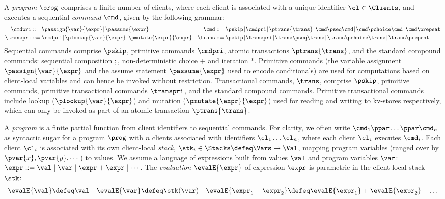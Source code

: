 A \emph{program} \( \prog \) comprises a finite number of clients,
where each client is associated with a unique identifier \( \cl \in \Clients \), 
and executes a sequential \emph{command} $\cmd$, given by the following grammar:%
%
{%
\begin{align*}
\cmdpri & ::=  
\passign{\var}{\expr} \!\mid\! 
\passume{\expr} 
&
\cmd & ::=  
\pskip \!\mid\!
\cmdpri \!\mid\!  
\ptrans{\trans} \!\mid\! 
\cmd \pseq \cmd \!\mid\! 
\cmd \pchoice \cmd \!\mid\! 
\cmd \prepeat  
\\
\transpri & ::= 
\cmdpri \!\mid\!
\plookup{\var}{\expr} \!\mid\!
\pmutate{\expr}{\expr} 
&
\trans & ::=
\pskip \!\mid\!
\transpri \!\mid\! 
\trans \pseq \trans \!\mid\!
\trans \pchoice \trans \!\mid\!
\trans\prepeat    
\end{align*}%
}%
%
%
Sequential commands comprise $\pskip$, primitive commands $\cmdpri
$, atomic transactions
$\ptrans{\trans}$, and the standard
compound commands:
sequential composition \( ; \), non-deterministic choice \( + \) and iteration \( * \).
Primitive commands (the variable assignment
$\passign{\var}{\expr}$ and the assume statement $\passume{\expr}$
used to encode conditionals) are used for computations based on 
client-local variables 
and can hence be invoked without restriction. 
Transactional commands, $\trans$, 
comprise $\pskip$, primitive commands, 
primitive transactional commands $\transpri$, and the standard compound commands.
Primitive transactional commands include lookup ($\plookup{\var}{\expr}$) and mutation 
($\pmutate{\expr}{\expr}$) used for reading and writing to kv-stores respectively, which
can only be invoked as part of an atomic transaction $\ptrans{\trans}$.

A {\em program} is a finite partial function from client identifiers to sequential
commands.
For clarity, we often write \( \cmd_{1}\ppar \dots \ppar \cmd_{n}\) as syntactic sugar 
for a program \( \prog \) with $n$ clients associated with identifiers
$\cl_1 \dots \cl_n$, where each client $\cl_i$ executes
$\cmd_i$. 
Each client $\cl_i$ is associated with its own client-local  \emph{stack}, 
$\stk_i \in \Stacks \defeq \Vars \to \Val$,  mapping program variables
(ranged over by $\pvar{x}, \pvar{y}, \cdots$)
to values. 
We assume a language of expressions built from values \( \val \)
and program variables \( \var \):
$\expr ::= \val \mid \var \mid \expr + \expr \mid \cdots$.
The \emph{evaluation} $\evalE{\expr}$ of expression $\expr$ is parametric in
the client-local stack \( \stk \):%
%
{%
\begin{gather*}
\evalE{\val} \defeq
\val
\quad
\evalE{\var} \defeq
\stk(\var)
\quad
\evalE{\expr_{1} + \expr_{2}} \defeq
\evalE{\expr_{1}} + \evalE{\expr_{2}}
\quad
\dots
\end{gather*}%
}%

